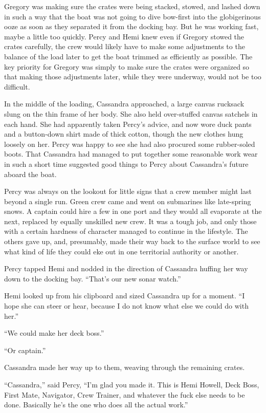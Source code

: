 \documentclass[
]{scrbook}
\begin{document}
Gregory was making sure the crates were being stacked, stowed, and
lashed down in such a way that the boat was not going to dive bow-first
into the globigerinous ooze as soon as they separated it from the
docking bay. But he was working fast, maybe a little too quickly. Percy
and Hemi knew even if Gregory stowed the crates carefully, the crew
would likely have to make some adjustments to the balance of the load
later to get the boat trimmed as efficiently as possible. The key
priority for Gregory was simply to make sure the crates were organized
so that making those adjustments later, while they were underway, would
not be too difficult.

In the middle of the loading, Cassandra approached, a large canvas
rucksack slung on the thin frame of her body. She also held over-stuffed
canvas satchels in each hand. She had apparently taken Percy's advice,
and now wore duck pants and a button-down shirt made of thick cotton,
though the new clothes hung loosely on her. Percy was happy to see she
had also procured some rubber-soled boots. That Cassandra had managed to
put together some reasonable work wear in such a short time suggested
good things to Percy about Cassandra's future aboard the boat.

Percy was always on the lookout for little signs that a crew member
might last beyond a single run. Green crew came and went on submarines
like late-spring snows. A captain could hire a few in one port and they
would all evaporate at the next, replaced by equally unskilled new crew.
It was a tough job, and only those with a certain hardness of character
managed to continue in the lifestyle. The others gave up, and,
presumably, made their way back to the surface world to see what kind of
life they could eke out in one territorial authority or another.

Percy tapped Hemi and nodded in the direction of Cassandra huffing her
way down to the docking bay. ``That's our new sonar watch.''

Hemi looked up from his clipboard and sized Cassandra up for a moment.
``I hope she can steer or hear, because I do not know what else we could
do with her.''

``We could make her deck boss.''

``Or captain.''

Cassandra made her way up to them, weaving through the remaining crates.

``Cassandra,'' said Percy, ``I'm glad you made it. This is Hemi Howell,
Deck Boss, First Mate, Navigator, Crew Trainer, and whatever the fuck
else needs to be done. Basically he's the one who does all the actual
work.''
\end{document}
